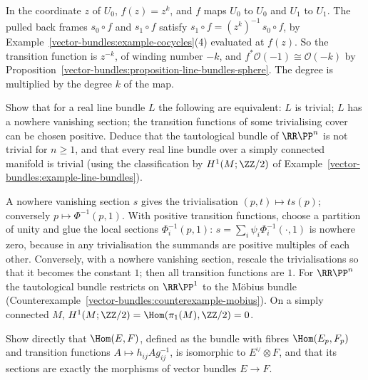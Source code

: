\begin{solution}
In the coordinate $z$ of $U_0$, $f(z) = z^k$, and $f$ maps $U_0$ to $U_0$ and $U_1$ to $U_1$. The pulled back frames $s_0 \circ f$ and $s_1 \circ f$ satisfy
$s_1 \circ f = (z^k)^{-1}\,s_0 \circ f$, by Example~\ref{vector-bundles:example-cocycles}(4) evaluated at $f(z)$. So the transition function is $z^{-k}$, of winding number $-k$, and
$f^*\mathcal{O}(-1) \cong \mathcal{O}(-k)$ by Proposition~\ref{vector-bundles:proposition-line-bundles-sphere}. The degree is multiplied by the degree $k$ of the map.
\end{solution}

\begin{exercise}\label{vector-bundles:exercise-real-line-bundles}
Show that for a real line bundle $L$ the following are equivalent: $L$ is trivial; $L$ has a nowhere vanishing section; the transition functions of some trivialising cover can be
chosen positive. Deduce that the tautological bundle of $\RR\PP^n$ is not trivial for $n \geq 1$, and that every real line bundle over a simply connected manifold is trivial (using
the classification by $H^1(M; \ZZ/2)$ of Example~\ref{vector-bundles:example-line-bundles}).
\end{exercise}

\begin{solution}
A nowhere vanishing section $s$ gives the trivialisation $(p, t) \mapsto ts(p)$; conversely $p \mapsto \Phi^{-1}(p, 1)$. With positive transition functions, choose a partition of unity
and glue the local sections $\Phi_i^{-1}(p, 1)$: $s = \sum_i\psi_i\Phi_i^{-1}(\cdot, 1)$ is nowhere zero, because in any trivialisation the summands are positive multiples of each other.
Conversely, with a nowhere vanishing section, rescale the trivialisations so that it becomes the constant $1$; then all transition functions are $1$. For $\RR\PP^n$ the tautological bundle
restricts on $\RR\PP^1$ to the M\"obius bundle (Counterexample~\ref{vector-bundles:counterexample-mobius}). On a simply connected $M$, $H^1(M; \ZZ/2) = \Hom(\pi_1(M), \ZZ/2) = 0$.
\end{solution}

\begin{exercise}\label{vector-bundles:exercise-hom-cocycle}
Show directly that $\Hom(E, F)$, defined as the bundle with fibres $\Hom(E_p, F_p)$ and transition functions $A \mapsto h_{ij}Ag_{ij}^{-1}$, is isomorphic to $E^\vee \otimes F$, and that its sections
are exactly the morphisms of vector bundles $E \to F$.
\end{exercise}

